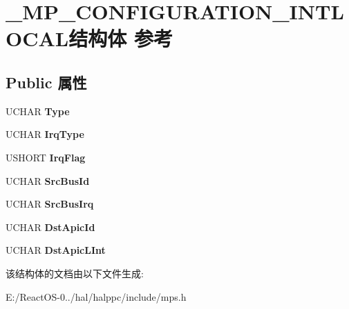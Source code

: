 \hypertarget{struct___m_p___c_o_n_f_i_g_u_r_a_t_i_o_n___i_n_t_l_o_c_a_l}{}\section{\+\_\+\+M\+P\+\_\+\+C\+O\+N\+F\+I\+G\+U\+R\+A\+T\+I\+O\+N\+\_\+\+I\+N\+T\+L\+O\+C\+A\+L结构体 参考}
\label{struct___m_p___c_o_n_f_i_g_u_r_a_t_i_o_n___i_n_t_l_o_c_a_l}
\subsection*{Public 属性}
\begin{DoxyCompactItemize}
\item 
\mbox{\label{struct___m_p___c_o_n_f_i_g_u_r_a_t_i_o_n___i_n_t_l_o_c_a_l_ac39bafefe2bb768af54eaf1b841dca54}} 
U\+C\+H\+AR {\bfseries Type}
\item 
\mbox{\label{struct___m_p___c_o_n_f_i_g_u_r_a_t_i_o_n___i_n_t_l_o_c_a_l_a31f65cbc7a2861f5b542964f00ec7edd}} 
U\+C\+H\+AR {\bfseries Irq\+Type}
\item 
\mbox{\label{struct___m_p___c_o_n_f_i_g_u_r_a_t_i_o_n___i_n_t_l_o_c_a_l_a3a6b449153dc01754701f205bb59c78d}} 
U\+S\+H\+O\+RT {\bfseries Irq\+Flag}
\item 
\mbox{\label{struct___m_p___c_o_n_f_i_g_u_r_a_t_i_o_n___i_n_t_l_o_c_a_l_abcc0a9b46844627122696da2cf4e944c}} 
U\+C\+H\+AR {\bfseries Src\+Bus\+Id}
\item 
\mbox{\label{struct___m_p___c_o_n_f_i_g_u_r_a_t_i_o_n___i_n_t_l_o_c_a_l_a0b2006567801c25d97351dcd42d1bdd2}} 
U\+C\+H\+AR {\bfseries Src\+Bus\+Irq}
\item 
\mbox{\label{struct___m_p___c_o_n_f_i_g_u_r_a_t_i_o_n___i_n_t_l_o_c_a_l_ad0f87a01aa50eee815c2b8c537122b70}} 
U\+C\+H\+AR {\bfseries Dst\+Apic\+Id}
\item 
\mbox{\label{struct___m_p___c_o_n_f_i_g_u_r_a_t_i_o_n___i_n_t_l_o_c_a_l_a1e8c11d8f242fa590221df6e23e246cd}} 
U\+C\+H\+AR {\bfseries Dst\+Apic\+L\+Int}
\end{DoxyCompactItemize}


该结构体的文档由以下文件生成\+:\begin{DoxyCompactItemize}
\item 
E\+:/\+React\+O\+S-\/0../hal/halppc/include/mps.\+h\end{DoxyCompactItemize}
